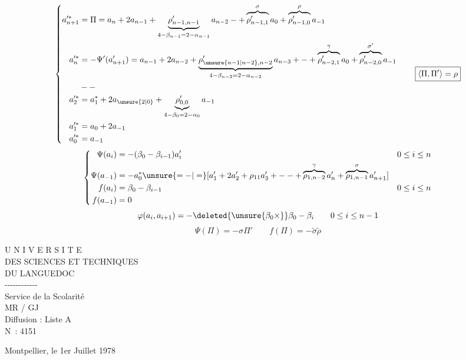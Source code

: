 \[
\left\{\begin{aligned}
a_{n+1}'^*&=\Pi=a_n+2a_{n-1}
+\underbrace{\rho'_{n-1,n-1}}_{4-\beta_{n-1}=2-\alpha_{n-1}}a_{n-2}
\mathbin{-}+
\overbrace{\rho'_{n-1,1}}^\sigma a_0+
\overbrace{\rho'_{n-1,0}}^\rho a_{-1}\\
a_n'^*&=-\Psi'(a'_{n+1})=a_{n-1}+2a_{n-2}
+\underbrace{\rho'_{\unsure{n-1|n-2},n-2}}_{4-\beta_{n-2}=2-\alpha_{n-2}}a_{n-3}
+\mathbin{-}+
\overbrace{\rho'_{n-2,1}}^\gamma a_0+
\overbrace{\rho'_{n-2,0}}^{\sigma'}a_{-1}\\
&\mathbin{-}\mathbin{-}\\
a_2'^*&=a_1^*+2a_{\unsure{2|0}}+
\underbrace{\rho'_{0,0}}_{4-\beta_0=2-\alpha_0}a_{-1}\\
a_1'^*&=a_0+2a_{-1}\\
a_0'^*&=a_{-1}
\end{aligned}\right.
\qquad \boxed{\langle\Pi,\Pi'\rangle=\rho}
\]
\[
\left\{\begin{aligned}
\Psi(a_i)&=-(\beta_0\mathbin{-}\beta_{i-1})a'_i
&&0\leq i\leq n\\
\Psi(a_{-1})&=-a_0^*\unsure{=-|=}
[a'_1+2a'_2+\rho_{11}a'_3+\mathbin{-}\mathbin{-}
+\overbrace{\rho_{1,n-2}}^\gamma a'_n+
\overbrace{\rho_{1,n-1}}^\sigma a'_{n+1}]\\
f(a_i)&=\beta_0\mathbin{-}\beta_{i-1}&&0\leq i\leq n\\
f(a_{-1})&=0
\end{aligned}\right.
\]
\margin{\[
f(a_0)=1,\quad f(a_1)=\beta_0,\mathbin{-},\quad
f(a_n)=\beta_0\mathbin{-}\beta_{n-1}=\unsure{B|\beta}
\]}
\[
\varphi(a_i,a_{i+1})=-\deleted{\unsure{\beta_0\times}}\beta_0\mathbin{-}\beta_i
\qquad0\leq i\leq n-1
\]
\[
\Psi(\Pi)=-\sigma\Pi'\qquad
f(\Pi)=-\widetilde\sigma\widetilde\rho
\]

\begin{center}
U N I V E R S I T E\\
DES SCIENCES ET TECHNIQUES\\
DU LANGUEDOC\\
-{}-{}-{}-{}-{}-{}-{}-{}-{}-{}-{}-\\
Service de la Scolarité\\
MR / GJ\\
Diffusion : Liste A\\
N\textdegree\ : 4151
\end{center}
Montpellier, le 1er Juillet 1978

